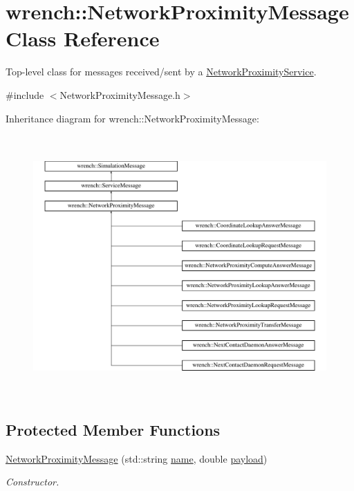 \hypertarget{classwrench_1_1_network_proximity_message}{}\section{wrench\+:\+:Network\+Proximity\+Message Class Reference}
\label{classwrench_1_1_network_proximity_message}


Top-\/level class for messages received/sent by a \hyperlink{classwrench_1_1_network_proximity_service}{Network\+Proximity\+Service}.  




{\ttfamily \#include $<$Network\+Proximity\+Message.\+h$>$}

Inheritance diagram for wrench\+:\+:Network\+Proximity\+Message\+:\begin{figure}[H]
\begin{center}
\leavevmode
\includegraphics[height=10.000000cm]{classwrench_1_1_network_proximity_message}
\end{center}
\end{figure}
\subsection*{Protected Member Functions}
\begin{DoxyCompactItemize}
\item 
\hyperlink{classwrench_1_1_network_proximity_message_a686b73df3ed6756f016340c570716a88}{Network\+Proximity\+Message} (std\+::string \hyperlink{classwrench_1_1_simulation_message_ab224f6dd8ec5ee2e7f65bfcdf2b8a86b}{name}, double \hyperlink{classwrench_1_1_simulation_message_a914f2732713f7c02898e66f05a7cb8a1}{payload})
\begin{DoxyCompactList}\small\item\em Constructor. \end{DoxyCompactList}\end{DoxyCompactItemize}
